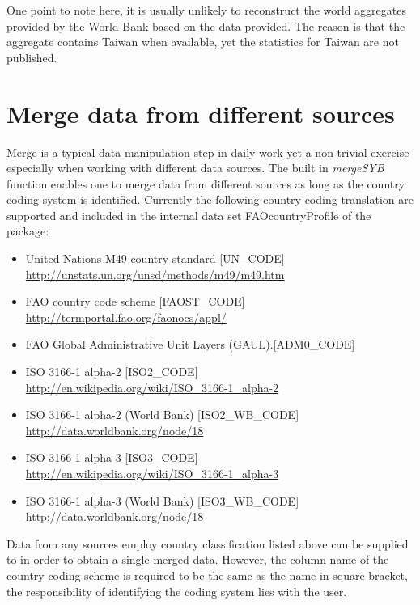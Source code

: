 \documentclass[nojss]{jss}\usepackage[]{graphicx}\usepackage[]{color}
\begin{document}
One point to note here, it is usually unlikely to reconstruct the world aggregates provided by the World Bank based on the data provided. The reason is that the aggregate contains Taiwan when available, yet the statistics for Taiwan are not published.

\section{Merge data from different sources}
Merge is a typical data manipulation step in daily work yet a non-trivial exercise especially when working with different data sources. The built in \textit{mergeSYB} function enables one to merge data from different sources as long as the country coding system is identified. Currently the following country coding translation are supported and included in the internal data set FAOcountryProfile of the package:

\begin{itemize}
  \item United Nations M49 country standard [UN\_CODE]\\
    \url{http://unstats.un.org/unsd/methods/m49/m49.htm}
  \item FAO country code scheme [FAOST\_CODE]\\
    \url{http://termportal.fao.org/faonocs/appl/}
  \item FAO Global Administrative Unit Layers (GAUL).[ADM0\_CODE]
  \item ISO 3166-1 alpha-2 [ISO2\_CODE]\\
    \url{http://en.wikipedia.org/wiki/ISO\_3166-1\_alpha-2}
  \item ISO 3166-1 alpha-2 (World Bank) [ISO2\_WB\_CODE]\\
    \url{http://data.worldbank.org/node/18}
  \item ISO 3166-1 alpha-3 [ISO3\_CODE]\\
    \url{http://en.wikipedia.org/wiki/ISO\_3166-1\_alpha-3}
  \item ISO 3166-1 alpha-3 (World Bank) [ISO3\_WB\_CODE]\\
    \url{http://data.worldbank.org/node/18}
\end{itemize}

Data from any sources employ country classification listed above can be supplied to  in order to obtain a single merged data. However, the column name of the country coding scheme is required to be the same as the name in square bracket, the responsibility of identifying the coding system lies with the user.
\end{document}
